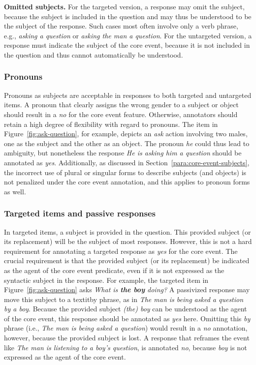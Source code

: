 \documentclass[12pt,notitlepage]{article}
\begin{document}
\textbf{Omitted subjects.} For the targeted version, a response may omit the subject, because the subject is included in the question and may thus be understood to be the subject of the response. Such cases most often involve only a verb phrase, e.g., \textit{asking a question} or \textit{asking the man a question}. For the untargeted version, a response must indicate the subject of the core event, because it is not included in the question and thus cannot automatically be understood.

\subsubsection{Pronouns} Pronouns as subjects are acceptable in responses to both targeted and untargeted items. A pronoun that clearly assigns the wrong gender to a subject or object should result in a \textit{no} for the core event feature. Otherwise, annotators should retain a high degree of flexibility with regard to pronouns. The item in Figure~\ref{fig:ask-question}, for example, depicts an \textit{ask} action involving two males, one as the subject and the other as an object. The pronoun \textit{he} could thus lead to ambiguity, but nonetheless the response \textit{He is asking him a question} should be annotated as \textit{yes}. Additionally, as discussed in Section~\ref{para:core-event-subjects}, the incorrect use of plural or singular forms to describe subjects (and objects) is not penalized under the core event annotation, and this applies to pronoun forms as well. 

\subsubsection{Targeted items and passive responses} \label{sec:core-targeted} In targeted items, a subject is provided in the question. This provided subject (or its replacement) will be the subject of most responses. However, this is not a hard requirement for annotating a targeted response as \textit{yes} for the core event. The crucial requirement is that the provided subject (or its replacement) be indicated as the agent of the core event predicate, even if it is not expressed as the syntactic subject in the response. For example, the targeted item in Figure~\ref{fig:ask-question} asks \textit{What is \textbf{the boy} doing?} A passivized response may move this subject to a textit{by} phrase, as in \textit{The man is being asked a question by a boy}. Because the provided subject \textit{(the) boy} can be understood as the agent of the core event, this response should be annotated as \textit{yes} here. Omitting this \textit{by} phrase (i.e., \textit{The man is being asked a question}) would result in a \textit{no} annotation, however, because the provided subject is lost. 
A response that reframes the event like \textit{The man is listening to a boy's question}, is annotated \textit{no}, because \textit{boy} is not expressed as the agent of the core event. 
\end{document}

